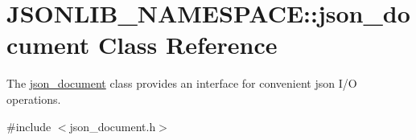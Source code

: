\hypertarget{classJSONLIB__NAMESPACE_1_1json__document}{}\section{J\+S\+O\+N\+L\+I\+B\+\_\+\+N\+A\+M\+E\+S\+P\+A\+CE\+:\+:json\+\_\+document Class Reference}
\label{classJSONLIB__NAMESPACE_1_1json__document}


The \hyperlink{classJSONLIB__NAMESPACE_1_1json__document}{json\+\_\+document} class provides an interface for convenient json I/O operations.  




{\ttfamily \#include $<$json\+\_\+document.\+h$>$}

